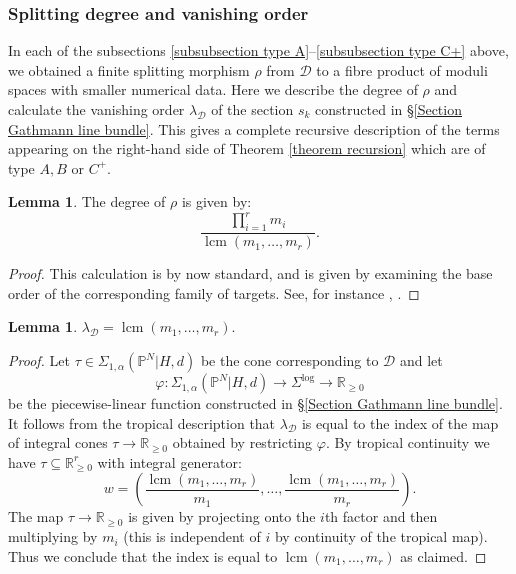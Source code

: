 \documentclass[11pt]{amsart}
\newcommand{\lcm}{\operatorname{lcm}}
\newcommand{\PP}{\mathbb P}
\renewcommand{\to}{\rightarrow}
\newcommand{\Dcal}{\mathcal{D}}
\newcommand{\RR}{\mathbb{R}}
\theoremstyle{definition}
\newtheorem{lemma}[thm]{Lemma}
\theoremstyle{definition}
\begin{document}
\subsubsection{Splitting degree and vanishing order} \label{subsubsection splitting degree} In each of the subsections \ref{subsubsection type A}--\ref{subsubsection type C+} above, we obtained a finite splitting morphism $\rho$ from $\Dcal$ to a fibre product of moduli spaces with smaller numerical data. Here we describe the degree of $\rho$ and calculate the vanishing order $\lambda_\Dcal$ of the section $s_k$ constructed in \S \ref{Section Gathmann line bundle}. This gives a complete recursive description of the terms appearing on the right-hand side of Theorem \ref{theorem recursion} which are of type $A,B$ or $C^+$.

\begin{lemma}\label{lem:saturation} The degree of $\rho$ is given by:
\begin{equation*} \label{degree of gluing} \dfrac{\prod_{i=1}^r m_i}{\lcm(m_1,\ldots,m_r)}. \end{equation*}\end{lemma}
\begin{proof} This calculation is by now standard, and is given by examining the base order of the corresponding family of targets. See, for instance \cite{ChenDegeneration}, \cite{ACGSDecomposition}.
\end{proof}

\begin{lemma}\label{lemma vanishing order} $\lambda_\Dcal = \lcm(m_1,\ldots,m_r).$ \end{lemma}
\begin{proof} Let $\tau \in \Sigma_{1,\alpha}(\PP^N|H,d)$ be the cone corresponding to $\Dcal$ and let
\begin{equation*} \varphi \colon \Sigma_{1,\alpha}(\PP^N|H,d) \to \Sigma^{\log} \to \RR_{\geq 0} \end{equation*}
be the piecewise-linear function constructed in \S \ref{Section Gathmann line bundle}. It follows from the tropical description that $\lambda_\Dcal$ is equal to the index of the map of integral cones $\tau \to \RR_{\geq 0}$ obtained by restricting $\varphi$. By tropical continuity we have $\tau \subseteq \RR_{\geq 0}^r$ with integral generator:
\begin{equation*} w = \left( \dfrac{\lcm(m_1,\ldots,m_r)}{m_1},\ldots,\dfrac{\lcm(m_1,\ldots,m_r)}{m_r} \right).\end{equation*}
The map $\tau \to \RR_{\geq 0}$ is given by projecting onto the $i$th factor and then multiplying by $m_i$ (this is independent of $i$ by continuity of the tropical map). Thus we conclude that the index is equal to $\lcm(m_1,\ldots,m_r)$ as claimed.\end{proof}
\end{document}
